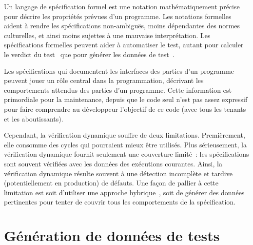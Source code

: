 Un {\strong langage de spécification formel} est une notation mathématiquement
précise pour décrire les propriétés prévues d'un programme. Les notations
formelles aident à rendre les spécifications non-ambiguës, moins dépendantes des
normes culturelles, et ainsi moins sujettes à une mauvaise interprétation. Les
spécifications formelles peuvent aider à automatiser le test, autant pour
calculer le verdict du test~\cite{CheonL02} que pour générer les données de
test~\cite{BernotGM91,KorelA98}.

Les spécifications qui documentent les interfaces des parties d'un programme
peuvent jouer un rôle central dans la programmation, décrivant les comportements
attendus des parties d'un programme. Cette information est primordiale pour la
maintenance, depuis que le code seul n'est pas assez expressif pour faire
comprendre au développeur l'objectif de ce code (avec tous les tenants et les
aboutissants).




Cependant, la vérification dynamique souffre de deux limitations. Premièrement,
elle consomme des cycles qui pourraient mieux être utilisés. Plus sérieusement,
la vérification dynamique fournit seulement une couverture limité~: les
spécifications sont souvent vérifiées avec les données des exécutions courantes.
Ainsi, la vérification dynamique résulte souvent à une détection incomplète et
tardive (potentiellement en production) de défauts. Une façon de pallier à cette
limitation est soit d'utiliser une approche hybrique~\cite{Flanagan06}, soit de
générer des données pertinentes pour tenter de couvrir tous les comportements de
la spécification.

\section{Génération de données de tests}

